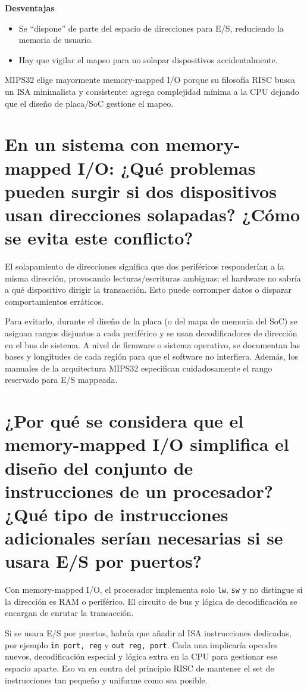 \documentclass{article}
\begin{document}
\textbf{Desventajas}  
\begin{itemize}
  \item Se “dispone” de parte del espacio de direcciones para E/S, reduciendo la memoria de usuario.  
  \item Hay que vigilar el mapeo para no solapar dispositivos accidentalmente.  
\end{itemize}

MIPS32 elige mayormente memory-mapped I/O porque su filosofía RISC busca un ISA minimalista y consistente: agrega complejidad mínima a la CPU dejando que el diseño de placa/SoC gestione el mapeo.

\section{En un sistema con memory-mapped I/O: ¿Qué problemas pueden surgir si dos dispositivos usan direcciones solapadas? ¿Cómo se evita este conflicto?}

El solapamiento de direcciones significa que dos periféricos responderían a la misma dirección, provocando lecturas/escrituras ambiguas: el hardware no sabría a qué dispositivo dirigir la transacción. Esto puede corromper datos o disparar comportamientos erráticos.

Para evitarlo, durante el diseño de la placa (o del mapa de memoria del SoC) se asignan rangos disjuntos a cada periférico y se usan decodificadores de dirección en el bus de sistema. A nivel de firmware o sistema operativo, se documentan las bases y longitudes de cada región para que el software no interfiera. Además, los manuales de la arquitectura MIPS32 especifican cuidadosamente el rango reservado para E/S mappeada.

\section{¿Por qué se considera que el memory-mapped I/O simplifica el diseño del conjunto de instrucciones de un procesador? ¿Qué tipo de instrucciones adicionales serían necesarias si se usara E/S por puertos?}

Con memory-mapped I/O, el procesador implementa solo \texttt{lw}, \texttt{sw} y no distingue si la dirección es RAM o periférico. El circuito de bus y lógica de decodificación se encargan de enrutar la transacción.

Si se usara E/S por puertos, habría que añadir al ISA instrucciones dedicadas, por ejemplo \texttt{in port, reg} y \texttt{out reg, port}. Cada una implicaría opcodes nuevos, decodificación especial y lógica extra en la CPU para gestionar ese espacio aparte. Eso va en contra del principio RISC de mantener el set de instrucciones tan pequeño y uniforme como sea posible.
\end{document}
